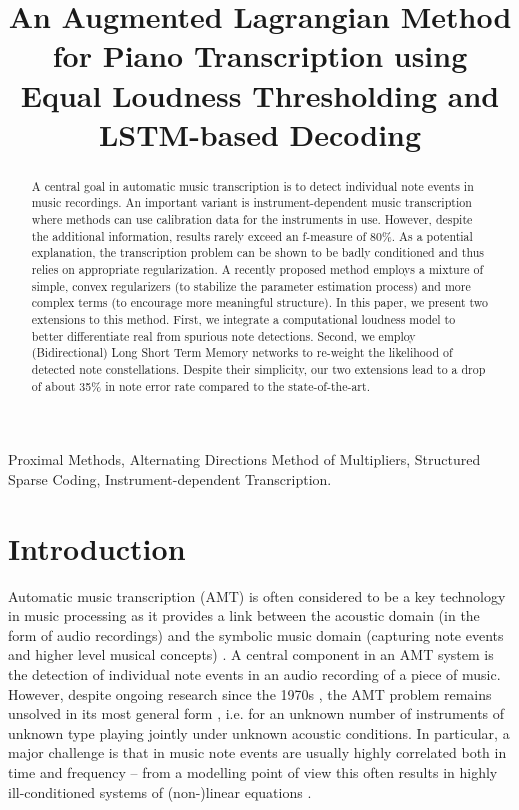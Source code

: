 \documentclass{article}
\title{An Augmented Lagrangian Method for Piano Transcription using \newline Equal Loudness Thresholding and LSTM-based Decoding}
\begin{document}
\ninept
\maketitle

\sloppy
\renewcommand{\baselinestretch}{0.935}
\selectfont

\begin{abstract}
A central goal in automatic music transcription is to detect individual note events in music recordings.
An important variant is instrument-dependent music transcription where methods can use calibration data for the instruments in use.
However, despite the additional information, results rarely exceed an f-measure of 80\%.
As a potential explanation,
the transcription problem can be shown to be badly conditioned and thus relies on appropriate regularization.
A recently proposed method employs a mixture of simple, convex regularizers (to stabilize the parameter estimation process) and more complex terms (to encourage more meaningful structure). 
In this paper, we present two extensions to this method.
First, we integrate a computational loudness model to better differentiate real from spurious note detections.
Second, we employ (Bidirectional) Long Short Term Memory networks to re-weight the likelihood of detected note constellations.
Despite their simplicity, our two extensions lead to a drop of about 35\% in note error rate compared to the state-of-the-art.
\end{abstract}

\begin{keywords}
Proximal Methods, Alternating Directions Method of Multipliers, Structured Sparse Coding, Instrument-dependent Transcription.
\end{keywords}

\section{Introduction}
\label{sec:intro}

Automatic music transcription (AMT) is often considered to be a key technology in music processing as it provides a link between the acoustic domain (in the form of audio recordings) and the symbolic music domain (capturing note events and higher level musical concepts) \cite{BenetosDGKK12_AMTGlassCeiling_ISMIR}.
A central component in an AMT system is the detection of individual note events in an audio recording of a piece of music.
However, despite ongoing research since the 1970s \cite{Moorer77_Transcription_CMJ}, the AMT problem remains unsolved in its most general form \cite{BenetosDGKK12_AMTGlassCeiling_ISMIR}, i.e. for an unknown number of instruments of unknown type playing jointly under unknown acoustic conditions. 
In particular, a major challenge is that in music note events are usually highly correlated both in time and frequency -- from a modelling point of view this often results in highly ill-conditioned systems of (non-)linear equations \cite{EwertS16_PianoTranscriptionADMM_TASLP}.
\end{document}
